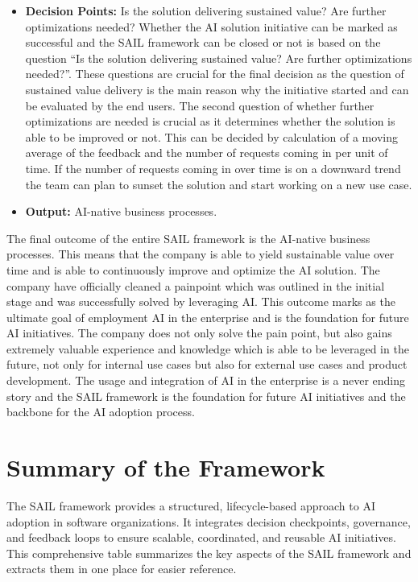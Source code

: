 \documentclass[]{imc-inf}
\begin{document}
\begin{itemize}
	\item
	\textbf{Decision Points:} Is the solution delivering sustained value?
	Are further optimizations needed? Whether the AI solution initiative
	can be marked as successful and the SAIL framework can be closed or
	not is based on the question ``Is the solution delivering sustained
	value? Are further optimizations needed?''. These questions are
	crucial for the final decision as the question of sustained value
	delivery is the main reason why the initiative started and can be
	evaluated by the end users. The second question of whether further
	optimizations are needed is crucial as it determines whether the
	solution is able to be improved or not. This can be decided by
	calculation of a moving average of the feedback and the number of
	requests coming in per unit of time. If the number of requests coming
	in over time is on a downward trend the team can plan to sunset the
	solution and start working on a new use case.
	\item
	\textbf{Output:} AI-native business processes.
\end{itemize}

The final outcome of the entire SAIL framework is the AI-native business
processes. This means that the company is able to yield sustainable
value over time and is able to continuously improve and optimize the AI
solution. The company have officially cleaned a painpoint which was
outlined in the initial stage and was successfully solved by leveraging
AI. This outcome marks as the ultimate goal of employment AI in the
enterprise and is the foundation for future AI initiatives. The company
does not only solve the pain point, but also gains extremely valuable
experience and knowledge which is able to be leveraged in the future,
not only for internal use cases but also for external use cases and
product development. The usage and integration of AI in the enterprise
is a never ending story and the SAIL framework is the foundation for
future AI initiatives and the backbone for the AI adoption process.

\section{Summary of the
	Framework}\label{summary-of-the-framework}

The SAIL framework provides a structured, lifecycle-based approach to AI
adoption in software organizations. It integrates decision checkpoints,
governance, and feedback loops to ensure scalable, coordinated, and
reusable AI initiatives. This comprehensive table summarizes the key aspects of the SAIL framework and extracts them in one place for easier reference.
\end{document}
